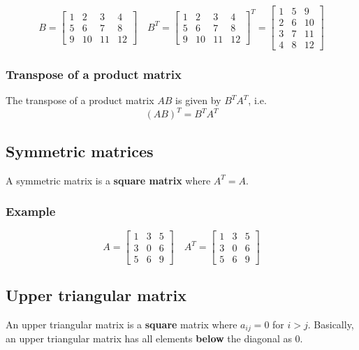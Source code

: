 \documentclass[11pt]{article}
\begin{document}
\begin{displaymath}
B = \begin{bmatrix}
1 & 2 & 3 & 4 \\
5 & 6 & 7 & 8 \\
9 & 10 & 11 & 12
\end{bmatrix} \quad B^{T} = \begin{bmatrix}
1 & 2 & 3 & 4 \\
5 & 6 & 7 & 8 \\
9 & 10 & 11 & 12
\end{bmatrix}^{T} = \begin{bmatrix}
1 & 5 & 9 \\
2 & 6 & 10 \\
3 & 7 & 11 \\
4 & 8 & 12
\end{bmatrix}
\end{displaymath}

\subsubsection{Transpose of a product matrix}
\label{sec:org84ba0c3}
The transpose of a product matrix \(AB\) is given by \(B^T A^T\), i.e.
\[(AB)^T = B^T A^T\]

\subsection{Symmetric matrices}
\label{sec:org74655a1}
A symmetric matrix is a \textbf{square matrix} where \(A^T = A\).

\subsubsection{Example}
\label{sec:orgdf0f3ec}
\begin{displaymath}
A = \begin{bmatrix}
1 & 3 & 5 \\
3 & 0 & 6 \\
5 & 6 & 9
\end{bmatrix} \quad A^T = \begin{bmatrix}
1 & 3 & 5 \\
3 & 0 & 6 \\
5 & 6 & 9
\end{bmatrix}
\end{displaymath}

\subsection{Upper triangular matrix}
\label{sec:orge148cd8}
An upper triangular matrix is a \textbf{square} matrix where \(a_{ij} = 0\) for \(i > j\). Basically, an upper triangular matrix has all elements \textbf{below} the diagonal as 0.
\end{document}
